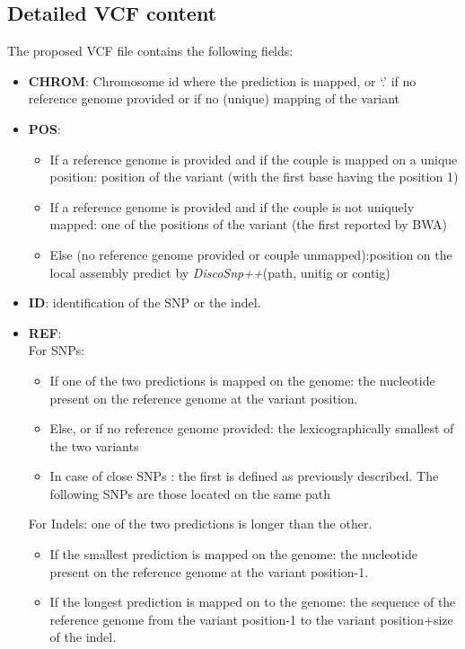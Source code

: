 \documentclass{bmcart}
\newcommand{\discopp}{{\it DiscoSnp++}\xspace}
\begin{document}
\subsection{Detailed VCF content}
The proposed VCF file contains the following fields:
\begin{itemize}
	\item \textbf{CHROM}: Chromosome id where the prediction is mapped, or `.' if no reference genome provided or if no (unique) mapping of the variant
	\item \textbf{POS}: 
	\begin{itemize}
		\item If a reference genome is provided and if the couple is mapped on a unique position: position of the variant (with the first base having the position 1)
		\item If a reference genome is provided and if the couple is not uniquely mapped: one of the positions of the variant (the first reported by BWA)
		\item Else (no reference genome provided or couple unmapped):position on the local assembly predict by \discopp (path, unitig or contig)
	\end{itemize}
	\item \textbf{ID}: identification of the SNP or the indel. 
	\item \textbf{REF}: \\
	For SNPs:
	\begin{itemize}
		\item If one of the two predictions is mapped on the genome: the nucleotide present on the reference genome at the variant position.
		\item Else, or if no reference genome provided: the lexicographically smallest of the two variants
		\item In case of close SNPs : the first is defined as previously described. The following SNPs are those located on the same path 
	\end{itemize}
	For Indels: one of the two predictions is longer than the other.%
	\begin{itemize}
		\item If the smallest prediction is mapped on the genome: the nucleotide present on the reference genome at the variant position-1.
		\item If the longest prediction is mapped on to the genome: the sequence of the reference genome from the variant position-1 to the variant position+size of the indel.

\end{itemize}
\end{itemize}
\end{document}
